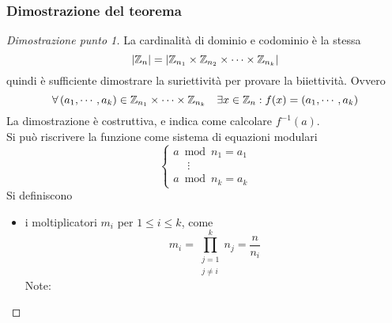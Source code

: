\subsubsection{Dimostrazione del teorema}

\begin{proof}
    [Dimostrazione punto 1]
    La cardinalità di dominio e codominio è la stessa
    \begin{equation*}
        |
        \mathbb{Z}_{n} 
        | = |
        \mathbb{Z}_{n_1} \times
        \mathbb{Z}_{n_2} \times
        \cdots
        \times
        \mathbb{Z}_{n_k}
        |
    \end{equation*}
    quindi è sufficiente dimostrare la suriettività per provare la biiettività.
    Ovvero
    \begin{equation*}
        \forall
        \left( 
            a_1, \cdots, a_k
        \right) 
        \in 
        \mathbb{Z}_{n_1} \times
        \cdots
        \times
        \mathbb{Z}_{n_k}
        \quad
        \exists x \in \mathbb{Z}_{n} 
        :
        f(x) =
        \left( 
            a_1, \cdots, a_k
        \right) 
    \end{equation*}
    La dimostrazione è costruttiva, e indica come calcolare $
    f^{-1}
    (a)
    $.
    \\
    Si può riscrivere la funzione come sistema di equazioni modulari
    \begin{equation*}
        \begin{cases}
            a \bmod n_1 = a_1
            \\
            \quad
            \;
            \vdots
            \\
            a \bmod n_k = a_k
        \end{cases}
    \end{equation*}
    Si definiscono
    \begin{itemize}
        \item i moltiplicatori $
            m_i
            $ per $
            1 \leq i \leq k
            $, come
            \begin{equation*}
                m_i = 
                \prod_{
                    \substack{
                        j=1
                        \\
                        j \ne i
                    }
                }^{k} n_j
                =
                \frac{n}{n_i}
            \end{equation*}
            Note:
            \begin{itemize}[noitemsep,parsep=0pt,partopsep=0pt,topsep=0pt]

\end{itemize}
\end{itemize}
\end{proof}
